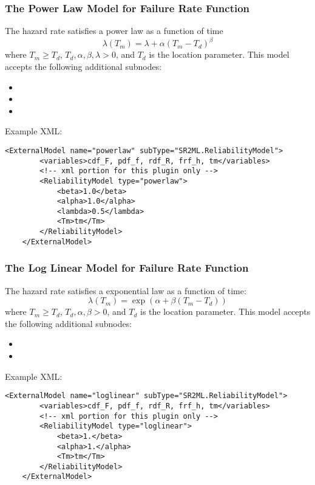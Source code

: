 \subsubsection{The Power Law Model for Failure Rate Function}
The hazard rate satisfies a power law as a function of time
\begin{equation}
	\lambda(T_m) = \lambda + \alpha(T_m-T_d)^\beta
\end{equation}
where $T_m\geq T_d$, $T_d, \alpha, \beta, \lambda >0$,
and $T_d$ is the location parameter.
This model accepts the following additional subnodes:
\begin{itemize}
	\item {}
	\item {}
	\item {}
\end{itemize}

Example XML:
\begin{lstlisting}[style=XML]
	<ExternalModel name="powerlaw" subType="SR2ML.ReliabilityModel">
		<variables>cdf_F, pdf_f, rdf_R, frf_h, tm</variables>
		<!-- xml portion for this plugin only -->
		<ReliabilityModel type="powerlaw">
			<beta>1.0</beta>
			<alpha>1.0</alpha>
			<lambda>0.5</lambda>
			<Tm>tm</Tm>
		</ReliabilityModel>
	</ExternalModel>
\end{lstlisting}


\subsubsection{The Log Linear Model for Failure Rate Function}
The hazard rate satisfies a exponential law as a function of time:
\begin{equation}
	\lambda(T_m) = \exp\left(\alpha+\beta(T_m-T_d)\right)
\end{equation}
where $T_m\geq T_d$, $T_d, \alpha, \beta >0$, and $T_d$ is the location parameter.
This model accepts the following additional subnodes:
\begin{itemize}
	\item {}
	\item {}
\end{itemize}

Example XML:
\begin{lstlisting}[style=XML]
	<ExternalModel name="loglinear" subType="SR2ML.ReliabilityModel">
		<variables>cdf_F, pdf_f, rdf_R, frf_h, tm</variables>
		<!-- xml portion for this plugin only -->
		<ReliabilityModel type="loglinear">
			<beta>1.</beta>
			<alpha>1.</alpha>
			<Tm>tm</Tm>
		</ReliabilityModel>
	</ExternalModel>
\end{lstlisting}


